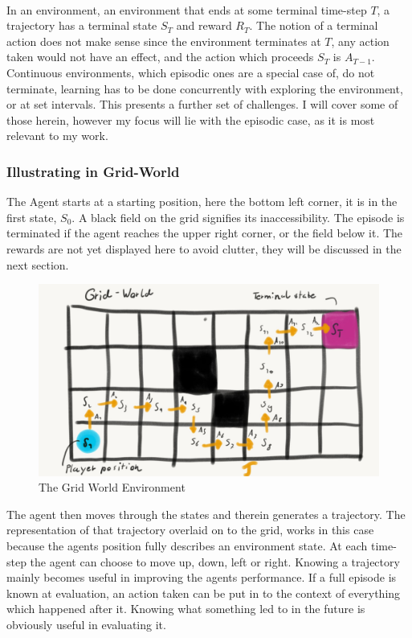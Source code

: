 \noindent
\\ In an  environment, an environment that ends at some terminal time-step $T$, a trajectory has a terminal state $S_T$ and reward $R_T$. The notion of a terminal action does not make sense since the environment terminates at $T$, any action taken would not have an effect, and the action which proceeds $S_T$ is $A_{T-1}$. Continuous environments, which episodic ones are a special case of, do not terminate, learning has to be done concurrently with exploring the environment, or at set intervals. This presents a further set of challenges. I will cover some of those herein, however my focus will lie with the episodic case, as it is most relevant to my work.

\subsubsection{Illustrating in Grid-World}\label{subsubsec:grid_world_trajectory}
The Agent starts at a starting position, here the bottom left corner, it is in the first state, $S_0$. A black field on the grid signifies its inaccessibility. The episode is terminated if the agent reaches the upper right corner, or the field below it. The rewards are not yet displayed here to avoid clutter, they will be discussed in the next section.

\begin{figure}[h!]
    \centering
    \includegraphics[width=0.7\linewidth]{figures/Grid_world_trajectory.jpeg}
    \caption{The Grid World Environment}
    \label{fig:grid_world}
\end{figure}

The agent then moves through the states and therein generates a trajectory. The representation of that trajectory overlaid on to the grid, works in this case because the agents position fully describes an environment state. At each time-step the agent can choose to move up, down, left or right. Knowing a trajectory mainly becomes useful in improving the agents performance. If a full episode is known at evaluation, an action taken can be put in to the context of everything which happened after it. Knowing what something led to in the future is obviously useful in evaluating it.

